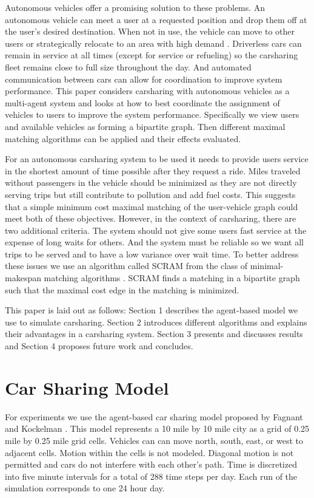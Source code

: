 \documentclass[letterpaper]{article}
\begin{document}
Autonomous vehicles offer a promising solution to these problems. An autonomous vehicle can meet a user at a requested position and drop them off at the user's desired destination. When not in use, the vehicle can move to other users or strategically relocate to an area with high demand \cite{fagnant2014travel}. Driverless cars can remain in service at all times (except for service or refueling) so the carsharing fleet remains close to full size throughout the day. And automated communication between cars can allow for coordination to improve system performance. This paper considers carsharing with autonomous vehicles as a multi-agent system and looks at how to best coordinate the assignment of vehicles to users to improve the system performance. Specifically we view users and available vehicles as forming a bipartite graph. Then different maximal matching algorithms can be applied and their effects evaluated.

For an autonomous carsharing system to be used it needs to provide users service in the shortest amount of time possible after they request a ride. Miles traveled without passengers in the vehicle should be minimized as they are not directly serving trips but still contribute to pollution and add fuel costs. This suggests that a simple minimum cost maximal matching of the user-vehicle graph could meet both of these objectives. However, in the context of carsharing, there are two additional criteria. The system should not give some users fast service at the expense of long waits for others. And the system must be reliable so we want all trips to be served and to have a low variance over wait time. To better address these issues we use an algorithm called SCRAM from the class of minimal-makespan matching algorithms \cite{macalpine2015scram}. SCRAM finds a matching in a bipartite graph such that the maximal cost edge in the matching is minimized. 

This paper is laid out as follows: Section 1 describes the agent-based model we use to simulate carsharing. Section 2 introduces different algorithms and explains their advantages in a carsharing system. Section 3 presents and discusses results and Section 4 proposes future work and concludes.


\section{Car Sharing Model}

For experiments we use the agent-based car sharing model proposed by Fagnant and Kockelman \cite{fagnant2014travel}. This model represents a 10 mile by 10 mile city as a grid of 0.25 mile by 0.25 mile grid cells. Vehicles can can move north, south, east, or west to adjacent cells. Motion within the cells is not modeled. Diagonal motion is not permitted and cars do not interfere with each other's path. Time is discretized into five minute intervals for a total of 288 time steps per day. Each run of the simulation corresponds to one 24 hour day.
\end{document}
